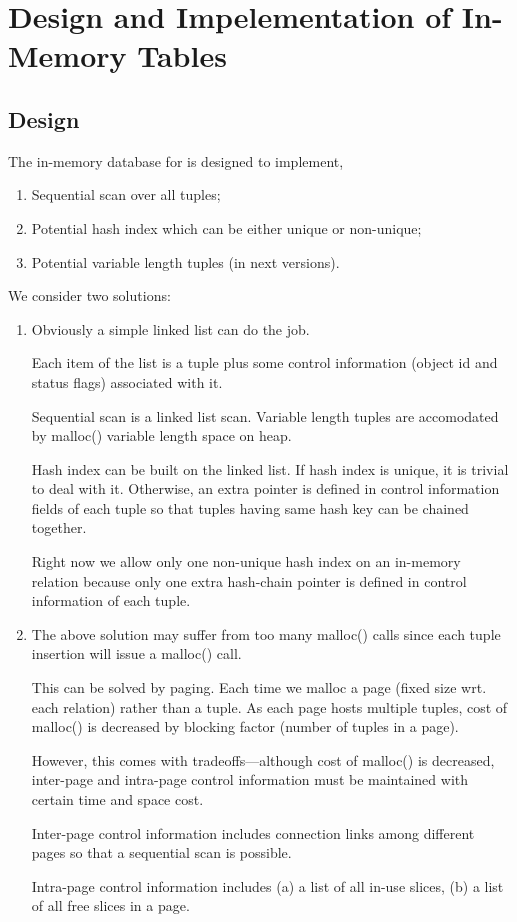 \chapter{Design and Impelementation of In-Memory Tables}
\section{Design}

The in-memory database for {\AXL} is designed to implement,
\begin{enumerate}
\item Sequential scan over all tuples;
\item Potential hash index which can be either unique or non-unique;
\item Potential variable length tuples (in next versions).
\end{enumerate}

We consider two solutions:
\begin{enumerate}
\item Obviously a simple linked list can do the job.

      Each item of the list is a tuple plus some control information
      (object id and status flags) associated with it.

      Sequential scan is a linked list scan.  Variable length tuples
      are accomodated by malloc() variable length space on heap.

      Hash index can be built on the linked list.  If hash index is
      unique, it is trivial to deal with it.  Otherwise, an extra
      pointer is defined in control information fields of each tuple
      so that tuples having same hash key can be chained together.

      Right now we allow only one non-unique hash index on an
      in-memory relation because only one extra hash-chain pointer is
      defined in control information of each tuple.
\item The above solution may suffer from too many malloc() calls since
      each tuple insertion will issue a malloc() call.

      This can be solved by paging.  Each time we malloc a page (fixed
      size wrt. each relation) rather than a tuple.  As each page
      hosts multiple tuples, cost of malloc() is decreased by blocking
      factor (number of tuples in a page).

      However, this comes with tradeoffs---although cost of malloc()
      is decreased, inter-page and intra-page control information must
      be maintained with certain time and space cost.

      Inter-page control information includes connection links among
      different pages so that a sequential scan is possible.

      Intra-page control information includes (a) a list of all in-use
      slices, (b) a list of all free slices in a page.
\end{enumerate}

